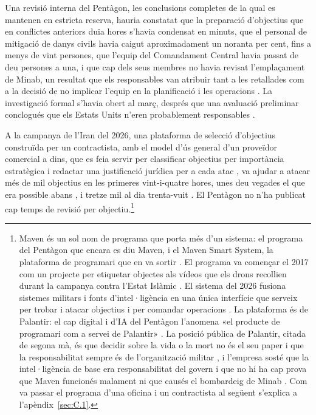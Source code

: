 Una revisió interna del Pentàgon, les conclusions completes de la qual es mantenen en estricta reserva, hauria constatat que la preparació d'objectius que en conflictes anteriors duia hores s'havia condensat en minuts, que el personal de mitigació de danys civils havia caigut aproximadament un noranta per cent, fins a menys de vint persones, que l'equip del Comandament Central havia passat de deu persones a una, i que cap dels seus membres no havia revisat l'emplaçament de Minab, un resultat que els responsables van atribuir tant a les retallades com a la decisió de no implicar l'equip en la planificació i les operacions \autocite{Bloomberg2026KillChain}. La investigació formal s'havia obert al març, després que una avaluació preliminar conclogués que els Estats Units n'eren probablement responsables \autocite{NPR2026MinabProbe}.

A la campanya de l'Iran del 2026, una plataforma de selecció d'objectius construïda per un contractista, amb el model d'ús general d'un proveïdor comercial a dins, que es feia servir per classificar objectius per importància estratègica i redactar una justificació jurídica per a cada atac \autocite{livingstone2026maven}, va ajudar a atacar més de mil objectius en les primeres vint-i-quatre hores, unes deu vegades el que era possible abans \autocite{csis2026maven}, i tretze mil al dia trenta-vuit \autocite{breakingdefense2026maven}. El Pentàgon no n'ha publicat cap temps de revisió per objectiu.\footnote{Maven és un sol nom de programa que porta més d'un sistema: el programa del Pentàgon que encara es diu Maven, i el Maven Smart System, la plataforma de programari que en va sortir \autocite{csis2026maven}. El programa va començar el 2017 com un projecte per etiquetar objectes als vídeos que els drons recollien durant la campanya contra l'Estat Islàmic \autocite{weisgerber2017maven,fang2019maven}. El sistema del 2026 fusiona sistemes militars i fonts d'intel·ligència en una única interfície que serveix per trobar i atacar objectius i per comandar operacions \autocite{defensescoop2026transition}. La plataforma és de Palantir: el cap digital i d'IA del Pentàgon l'anomena «el producte de programari com a servei de Palantir» \autocite{defensescoop2026transition}. La posició pública de Palantir, citada de segona mà, és que decidir sobre la vida o la mort no és el seu paper i que la responsabilitat sempre és de l'organització militar \autocite{lee2026palantir}, i l'empresa sosté que la intel·ligència de base era responsabilitat del govern i que no hi ha cap prova que Maven funcionés malament ni que causés el bombardeig de Minab \autocite{Bloomberg2026KillChain}. Com va passar el programa d'una oficina i un contractista al següent s'explica a l'apèndix~\ref{sec:C.1}.}

